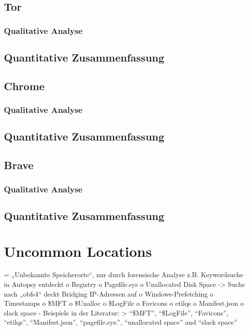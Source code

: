 \subsection{Tor}

\subsubsection*{Qualitative Analyse}

\subsection*{Quantitative Zusammenfassung}


\subsection{Chrome}

\subsubsection*{Qualitative Analyse}

\subsection*{Quantitative Zusammenfassung}


\subsection{Brave}

\subsubsection*{Qualitative Analyse}

\subsection*{Quantitative Zusammenfassung}





\section{Uncommon Locations}

= „Unbekannte Speicherorte“, nur durch forensische Analyse z.B. Keywordsuche in Autopsy entdeckt
o	Registry
o	Pagefile.sys
o	Unallocated Disk Space
	->	Suche nach „obfs4“ deckt Bridging IP-Adressen auf
o	Windows-Prefetching
o	Timestamps
o	\$MFT
o	\$Unalloc
o	\$LogFile
o	Favicons
o	etilqs
o	Manifest.json
o	slack space
- Beispiele in der Literatur:
	> “\$MFT”, “\$LogFile”, “Favicons”, “etilqs”, “Manifest.json”, “pagefile.sys.”, “unallocated space” and “slack space” \cite{Montasari.2015}


